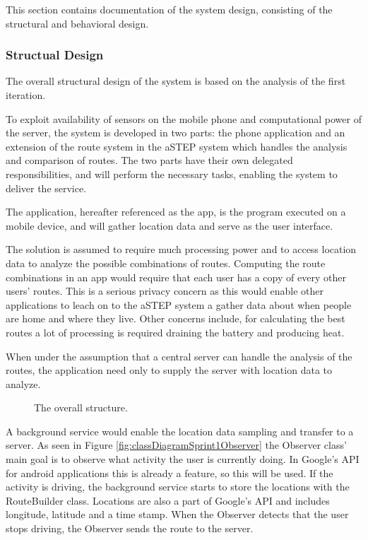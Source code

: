 This section contains documentation of the system design, consisting of the structural and behavioral design.

\subsubsection{Structual Design}
The overall structural design of the system is based on the analysis of the first iteration.

To exploit availability of sensors on the mobile phone and computational power of the server, the system is developed in two parts: the phone application and an extension of the route system in the aSTEP system which handles the analysis and comparison of routes.
The two parts have their own delegated responsibilities, and will perform the necessary tasks, enabling the system to deliver the service.

The application, hereafter referenced as the app, is the program executed on a mobile device, and will gather location data and serve as the user interface. 

The solution is assumed to require much processing power and to access location data to analyze the possible combinations of routes.
Computing the route combinations in an app would require that each user has a copy of every other users' routes.
This is a serious privacy concern as this would enable other applications to leach on to the aSTEP system a gather data about when people are home and where they live.
Other concerns include, for calculating the best routes a lot of processing is required draining the battery and producing heat.

When under the assumption that a central server can handle the analysis of the routes, the application need only to supply the server with location data to analyze.

\begin{figure}[h]
	\centering
	
	\caption{The overall structure.}
	\label{fig:packageDiagramSprint1}
\end{figure}

A background service would enable the location data sampling and transfer to a server.
As seen in Figure \ref{fig:classDiagramSprint1Observer} the Observer class' main goal is to observe what activity the user is currently doing.
In Google's API for android applications this is already a feature, so this will be used.
If the activity is driving, the background service starts to store the locations with the RouteBuilder class.
Locations are also a part of Google's API and includes longitude, latitude and a time stamp.
When the Observer detects that the user stops driving, the Observer sends the route to the server.

